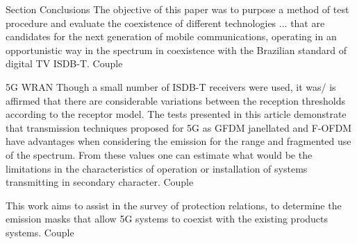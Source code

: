 Section {Conclusions}
The objective of this paper was to purpose a method of test procedure and evaluate the coexistence of different technologies ...
that are candidates for the next generation of mobile communications,  operating in an opportunistic way in the spectrum in coexistence with the Brazilian standard of digital TV ISDB-T. Couple

5G WRAN 
Though a small number of ISDB-T receivers were used, it was/ is affirmed that there are considerable variations between the reception thresholds according to the receptor model.
The tests presented in this article demonstrate that transmission techniques proposed for 5G as GFDM janellated and F-OFDM have advantages when considering the emission for the range and fragmented use of the spectrum. From these values one can estimate what would be the limitations in the characteristics of operation or installation of systems transmitting in secondary character. Couple

This work aims to assist in the survey of protection relations, to determine the emission masks that allow 5G systems to coexist with the existing products systems. Couple
